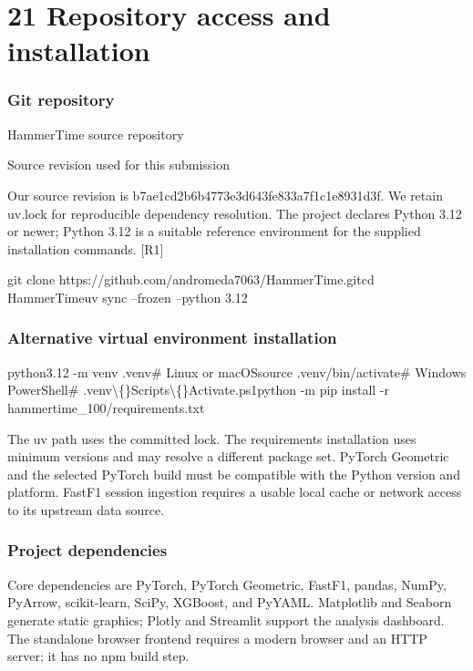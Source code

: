 \documentclass[11pt,a4paper,oneside]{report}
\begin{document}
\clearpage\chapter*{21 Repository access and installation}

\subsection*{Git repository}

HammerTime source repository

Source revision used for this submission

Our source revision is b7ae1cd2b6b4773e3d643fe833a7f1c1e8931d3f. We retain uv.lock for reproducible dependency resolution. The project declares Python 3.12 or newer; Python 3.12 is a suitable reference environment for the supplied installation commands. [R1]

git clone https://github.com/andromeda7063/HammerTime.gitcd HammerTimeuv sync --frozen --python 3.12

\subsection*{Alternative virtual environment installation}

python3.12 -m venv .venv\# Linux or macOSsource .venv/bin/activate\# Windows PowerShell\# .venv\textbackslash\{\}Scripts\textbackslash\{\}Activate.ps1python -m pip install -r hammertime\_100/requirements.txt

The uv path uses the committed lock. The requirements installation uses minimum versions and may resolve a different package set. PyTorch Geometric and the selected PyTorch build must be compatible with the Python version and platform. FastF1 session ingestion requires a usable local cache or network access to its upstream data source.

\subsection*{Project dependencies}

Core dependencies are PyTorch, PyTorch Geometric, FastF1, pandas, NumPy, PyArrow, scikit-learn, SciPy, XGBoost, and PyYAML. Matplotlib and Seaborn generate static graphics; Plotly and Streamlit support the analysis dashboard. The standalone browser frontend requires a modern browser and an HTTP server; it has no npm build step.
\end{document}
